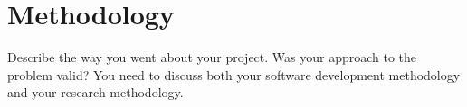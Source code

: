 \chapter{Methodology}
Describe the way you went about your project. Was your approach to the problem valid?
You need to discuss both your software development methodology and your research methodology.

